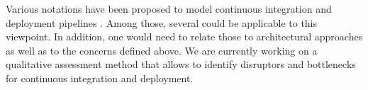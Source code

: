 Various notations have been proposed to model continuous integration and deployment pipelines \cite{SB2014}.
Among those, several could be applicable to this viewpoint.
In addition, one would need to relate those to architectural approaches as well as to the concerns defined above. 
We are currently working on a qualitative assessment method that allows to identify disruptors and bottlenecks for continuous integration and deployment.









